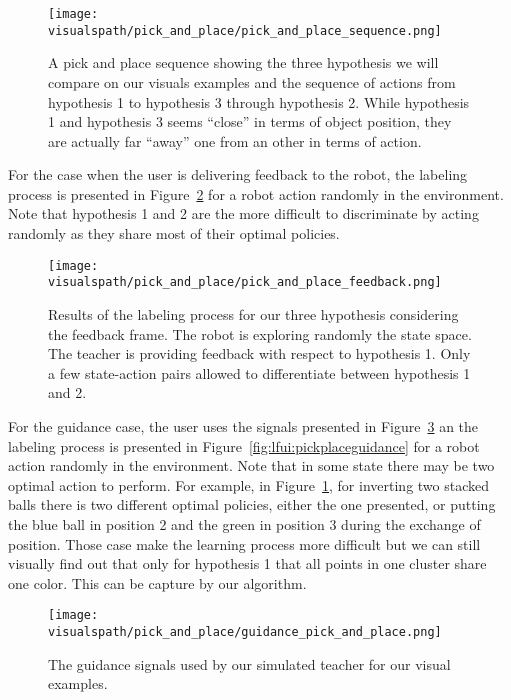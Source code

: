 \begin{figure}[!ht]
  \centering
  \texttt{[image: \\visualspath/pick\_and\_place/pick\_and\_place\_sequence.png]}
  \caption{A pick and place sequence showing the three hypothesis we will compare on our visuals examples and the sequence of actions from hypothesis 1 to hypothesis 3 through hypothesis 2. While hypothesis 1 and hypothesis 3 seems ``close'' in terms of object position, they are actually far ``away'' one from an other in terms of action.}
  \label{fig:lfui:pickplacesequence}
\end{figure}

For the case when the user is delivering feedback to the robot, the labeling process is presented in Figure~\ref{fig:lfui:pickplacefeedback} for a robot action randomly in the environment. Note that hypothesis 1 and 2 are the more difficult to discriminate by acting randomly as they share most of their optimal policies.

\begin{figure}[!ht]
  \centering
  \texttt{[image: \\visualspath/pick\_and\_place/pick\_and\_place\_feedback.png]}
  \caption{Results of the labeling process for our three hypothesis considering the feedback frame. The robot is exploring randomly the state space. The teacher is providing feedback with respect to hypothesis 1. Only a few state-action pairs allowed to differentiate between hypothesis 1 and 2.}
  \label{fig:lfui:pickplacefeedback}
\end{figure}


For the guidance case, the user uses the signals presented in Figure~\ref{fig:lfui:pickplaceguidancesignals} an the labeling process is presented in Figure~\ref{fig:lfui:pickplaceguidance} for a robot action randomly in the environment. Note that in some state there may be two optimal action to perform. For example, in Figure~\ref{fig:lfui:pickplacesequence}, for inverting two stacked balls there is two different optimal policies, either the one presented, or putting the blue ball in position 2 and the green in position 3 during the exchange of position. Those case make the learning process more difficult but we can still visually find out that only for hypothesis 1 that all points in one cluster share one color. This can be capture by our algorithm.

\begin{figure}[!ht]
  \centering
  \texttt{[image: \\visualspath/pick\_and\_place/guidance\_pick\_and\_place.png]}
  \caption{The guidance signals used by our simulated teacher for our visual examples.}
  \label{fig:lfui:pickplaceguidancesignals}
\end{figure}

